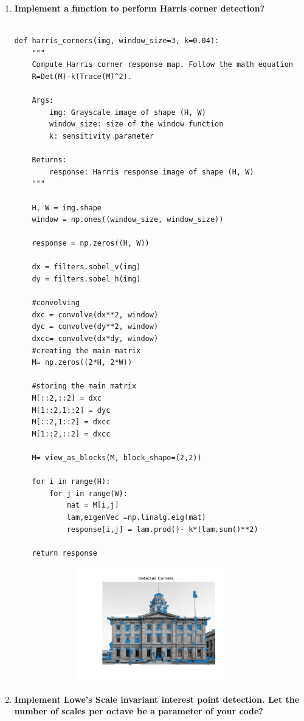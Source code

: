 \documentclass[a4paper, nobib]{tufte-handout}
\begin{document}
\begin{enumerate}
  \item \textbf{Implement a function to perform \textbf{Harris corner}
    detection?}
      \begin{verbatim}

def harris_corners(img, window_size=3, k=0.04):
    """
    Compute Harris corner response map. Follow the math equation
    R=Det(M)-k(Trace(M)^2).
        
    Args:
        img: Grayscale image of shape (H, W)
        window_size: size of the window function
        k: sensitivity parameter

    Returns:
        response: Harris response image of shape (H, W)
    """

    H, W = img.shape
    window = np.ones((window_size, window_size))

    response = np.zeros((H, W))

    dx = filters.sobel_v(img)
    dy = filters.sobel_h(img)

    #convolving 
    dxc = convolve(dx**2, window)
    dyc = convolve(dy**2, window)
    dxcc= convolve(dx*dy, window) 
    #creating the main matrix
    M= np.zeros((2*H, 2*W))
    
    #storing the main matrix
    M[::2,::2] = dxc
    M[1::2,1::2] = dyc
    M[::2,1::2] = dxcc 
    M[1::2,::2] = dxcc
    
    M= view_as_blocks(M, block_shape=(2,2))

    for i in range(H):
        for j in range(W):
            mat = M[i,j]
            lam,eigenVec =np.linalg.eig(mat)
            response[i,j] = lam.prod()- k*(lam.sum()**2)

    return response

    \end{verbatim}
  \begin{figure}[ht!]
  \centering
  \includegraphics[width=10cm, height=5cm]{./harris_response.png}
\end{figure}

\item \textbf{Implement Lowe's Scale invariant interest point detection. Let the
  number of scales per octave be a parameter of your code?}
\end{enumerate}

\end{document}
